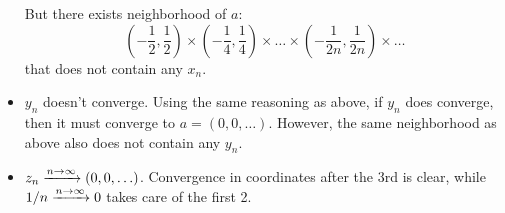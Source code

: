 \documentclass[a4paper, 12pt]{article}
\begin{document}
\begin{solution}
\begin{itemize}
But there exists neighborhood of $a$:
\begin{equation*}
\left(-\frac{1}{2}, \frac{1}{2}\right) \times\left(-\frac{1}{4}, \frac{1}{4}\right) \times \ldots \times \left(-\frac{1}{2n}, \frac{1}{2n}\right) \times \ldots
\end{equation*}
that does not contain any $x_n$.

\item $y_n$ doesn't converge. Using the same reasoning as above, if $y_n$ does converge, then it must converge to $a = (0, 0, \ldots)$. However, the same neighborhood as above also does not contain any $y_n$.

\item $z_n \xrightarrow{n \to \infty} (0, 0, \ldots)$. Convergence in coordinates after the 3rd is clear, while $1/n \xrightarrow{n \to \infty} 0$ takes care of the first 2.
\end{itemize}
\end{solution}
\end{document}
